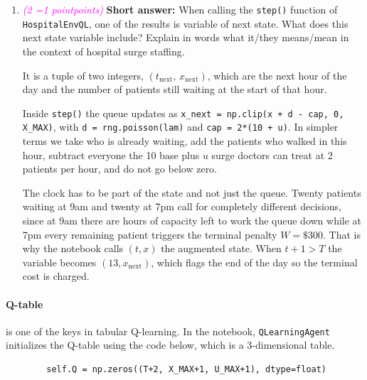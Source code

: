 \documentclass[11pt, letter, answers]{exam}
\newcommand{\grade}[1]{
    \small\textcolor{magenta}{\emph{(#1 \ifnum#1=1 point\else points\fi)}}%
    \normalsize
}
\newcommand{\saq}{\textbf{Short answer: }}
\begin{document}
\begin{enumerate}[label=(\alph*)]
\item \grade{2} \saq When calling the \texttt{step()} function of \texttt{HospitalEnvQL}, one of the results is variable of next state. What does this next state variable include? Explain in words what it/they means/mean in the context of hospital surge staffing.
\begin{answerBox}[height=2in]
It is a tuple of two integers, $(t_{\text{next}},\, x_{\text{next}})$, which are the next hour of the day and the number of patients still waiting at the start of that hour.

Inside \texttt{step()} the queue updates as \texttt{x\_next = np.clip(x + d - cap, 0, X\_MAX)}, with \texttt{d = rng.poisson(lam)} and \texttt{cap = 2*(10 + u)}. In simpler terms we take who is already waiting, add the patients who walked in this hour, subtract everyone the 10 base plus $u$ surge doctors can treat at 2 patients per hour, and do not go below zero.

The clock has to be part of the state and not just the queue. Twenty patients waiting at 9am and twenty at 7pm call for completely different decisions, since at 9am there are hours of capacity left to work the queue down while at 7pm every remaining patient triggers the terminal penalty $W = \$300$. That is why the notebook calls $(t,x)$ the augmented state. When $t+1 > T$ the variable becomes $(13, x_{\text{next}})$, which flags the end of the day so the terminal cost is charged.
\end{answerBox}


\end{enumerate}


\vspace{1em}
\paragraph{Q-table} is one of the keys in tabular Q-learning. In the notebook, \texttt{QLearningAgent} initializes the Q-table using the code below, which is a 3-dimensional table. 

\begin{lstlisting}
        self.Q = np.zeros((T+2, X_MAX+1, U_MAX+1), dtype=float)
\end{lstlisting}
\end{document}
